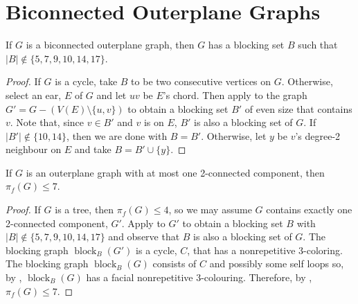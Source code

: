\documentclass{patmorin}
\DeclareMathOperator{\block}{block}
\begin{document}



\appendix
\section{Biconnected Outerplane Graphs}

\begin{lem}
  If $G$ is a biconnected outerplane graph, then $G$ has a blocking set $B$
  such that $|B|\not\in\{5,7,9,10,14,17\}$.
\end{lem}

\begin{proof}
  If $G$ is a cycle, take $B$ to be two consecutive vertices on $G$.
  Otherwise, select an ear, $E$ of $G$ and let $uv$ be $E$'s chord.  Then
  apply  to the graph $G'=G-(V(E)\setminus\{u,v\})$
  to obtain a blocking set $B'$ of even size that contains $v$. Note that,
  since $v\in B'$ and $v$ is on $E$,  $B'$ is also a blocking set of $G$.
  If $|B'|\not\in\{10, 14\}$, then we are done with $B=B'$. Otherwise,
  let $y$ be $v$'s degree-2 neighbour on $E$ and take $B=B'\cup\{y\}$.
\end{proof}

\begin{cor}
  If $G$ is an outerplane graph with at most one 2-connected component, 
  then $\pi_f(G)\le 7$.
\end{cor}

\begin{proof}
  If $G$ is a tree, then $\pi_f(G)\le 4$, so we may assume $G$ contains
  exactly one 2-connected component, $G'$.  Apply  to
  $G'$ to obtain a blocking set $B$ with $|B|\not\in\{5,7,9,10,14,17\}$
  and observe that $B$ is also a blocking set of $G$.  The blocking graph
  $\block_B(G')$ is a cycle, $C$, that has a nonrepetitive 3-coloring.
  The blocking graph $\block_B(G)$ consists of $C$ and possibly some
  self loops so, by , $\block_B(G)$ has a facial
  nonrepetitive 3-colouring.  Therefore, by ,
  $\pi_f(G)\le 7$.
\end{proof}
\end{document}
